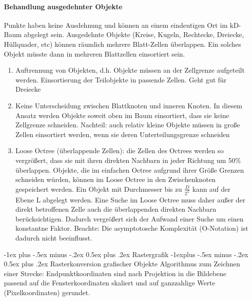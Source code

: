 \documentclass[10pt,landscape]{article}
\makeatletter
\renewcommand{\section}{\@startsection{section}{1}{0mm}%
                                {-1ex plus -.5ex minus -.2ex}%
                                {0.5ex plus .2ex}%
                                {\normalfont\large\bfseries}}
\renewcommand{\subsection}{\@startsection{subsection}{2}{0mm}%
                                {-1explus -.5ex minus -.2ex}%
                                {0.5ex plus .2ex}%
                                {\normalfont\normalsize\bfseries}}
\makeatother
\begin{document}
\begin{multicols}{3}
\paragraph*{Behandlung ausgedehnter Objekte}
Punkte haben keine Ausdehnung und können an einem eindeutigen Ort im kD-Baum abgelegt sein. Ausgedehnte Objekte (Kreise, Kugeln, Rechtecke, Dreiecke, Hüllquader, etc) können räumlich mehrere Blatt-Zellen überlappen. Ein solches Objekt müsste dann in mehreren Blattzellen einsortiert sein.
\begin{enumerate}
  \item Auftrennung von Objekten, d.h. Objekte müssen an der Zellgrenze aufgeteilt werden. Einsortierung der Teilobjekte in passende Zellen. Geht gut für Dreiecke
  \item Keine Unterscheidung zwischen Blattknoten und inneren Knoten. In diesem Ansatz werden Objekte soweit oben im Baum einsortiert, dass sie keine Zellgrenze schneiden. Nachteil: auch relativ kleine Objekte müssen in große Zellen einsortiert werden, wenn sie deren Unterteilungsgrenze schneiden
  \item Loose Octree (überlappende Zellen): die Zellen des Octrees werden so vergrößert, dass sie mit ihren direkten Nachbarn in jeder Richtung um 50\% überlappen. Objekte, die im einfachen Octree aufgrund ihrer Größe Grenzen schneiden würden, können im Loose Octree in den Zwischenknoten gespeichert werden. Ein Objekt mit Durchmesser bis zu $\frac{D}{2^L}$ kann auf der Ebene L abgelegt werden. Eine Suche im Loose Octree muss daher außer der direkt betroffenen Zelle auch die überlappenden direkten Nachbarn berücksichtigen. Dadurch vergrößert sich der Aufwand einer Suche um einen konstantne Faktor. Beachte: Die asymptotosche Komplexität (O-Notation) ist dadurch nicht beeinflusst.
\end{enumerate}

\section{Rastergrafik}
\subsection{ Rasterkonversion grafischer Objekte}
Algorithmus zum Zeichnen einer Strecke: Endpunktkoordinaten sind nach Projektion in die Bildebene passend auf die Fensterkoordinaten skaliert und auf ganzzahlige Werte (Pixelkoordinaten) gerundet.


\end{multicols}
\end{document}
